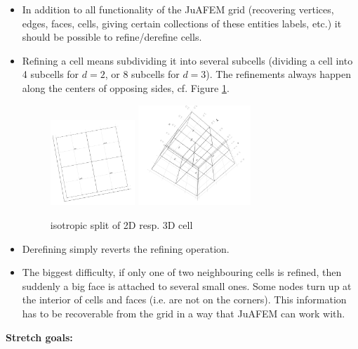 \documentclass{article}
\begin{document}
 \begin{itemize}
 \item In addition to all functionality of the JuAFEM grid (recovering vertices, edges, faces, cells, giving certain collections of these entities labels, etc.) it should be possible to refine/derefine cells.
 \item Refining a cell means subdividing it into several subcells (dividing a cell into 4 subcells for $d=2$, or 8 subcells for $d=3$). The refinements always happen along the centers of opposing sides, cf. Figure \ref{isotroicsplit}. 
 \begin{figure}[h!]
\centering
\includegraphics[width=0.3\textwidth]{images/2Dsplit.png}
\includegraphics[width=0.4\textwidth]{images/3Dsplit.png}
\caption{isotropic split of 2D resp. 3D cell}\label{isotroicsplit}
\end{figure}
 \item Derefining simply reverts the refining operation.
 \item The biggest difficulty, if only one of two neighbouring cells is refined, then suddenly a big face is attached to several small ones. Some nodes turn up at the interior of cells and faces (i.e. are not on the corners). This information has to be recoverable from the grid in a way that JuAFEM can work with.
\end{itemize}



{\bf Stretch goals:}
\end{document}
